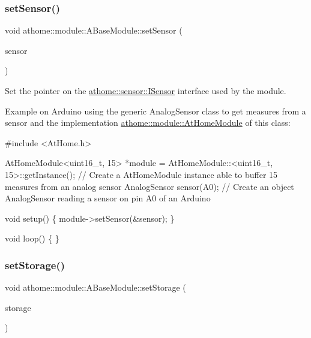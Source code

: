 \subsubsection{\texorpdfstring{set\+Sensor()}{setSensor()}}
{\footnotesize\ttfamily void athome\+::module\+::\+A\+Base\+Module\+::set\+Sensor (\begin{DoxyParamCaption}\item[{\mbox{\hyperlink{classathome_1_1sensor_1_1_i_sensor}{sensor\+::\+I\+Sensor}} $\ast$}]{sensor }\end{DoxyParamCaption})}

Set the pointer on the \mbox{\hyperlink{classathome_1_1sensor_1_1_i_sensor}{athome\+::sensor\+::\+I\+Sensor}} interface used by the module.

Example on Arduino using the generic Analog\+Sensor class to get measures from a sensor and the implementation \mbox{\hyperlink{classathome_1_1module_1_1_at_home_module}{athome\+::module\+::\+At\+Home\+Module}} of this class\+:


\begin{DoxyCode}
\textcolor{preprocessor}{#include <AtHome.h>}

AtHomeModule<uint16\_t, 15> *module = AtHomeModule::<uint16\_t,
15>::getInstance(); \textcolor{comment}{// Create a AtHomeModule instance able to buffer 15}
measures from an analog sensor AnalogSensor sensor(A0); \textcolor{comment}{// Create an object}
AnalogSensor reading a sensor on pin A0 of an Arduino

\textcolor{keywordtype}{void} setup() \{
  module->setSensor(&sensor);
\}

\textcolor{keywordtype}{void} loop() \{
\}
\end{DoxyCode}
 \mbox{\label{classathome_1_1module_1_1_a_base_module_a91e714579636e6f4a3628a23a8ba61e7}} 
\subsubsection{\texorpdfstring{set\+Storage()}{setStorage()}}
{\footnotesize\ttfamily void athome\+::module\+::\+A\+Base\+Module\+::set\+Storage (\begin{DoxyParamCaption}\item[{\mbox{\hyperlink{classathome_1_1storage_1_1_i_storage}{storage\+::\+I\+Storage}} $\ast$}]{storage }\end{DoxyParamCaption})}

